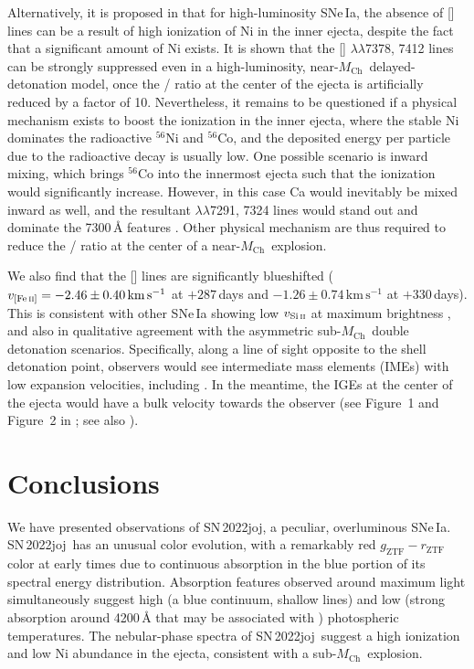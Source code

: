 \documentclass[twocolumn]{aastex631}
\newcommand{\sn}{SN\,2022joj}
\newcommand{\Mch}{$M_\mathrm{Ch}$}
\newcommand{\adam}[1]{\textcolor{orange}{[AAM: #1]}}
\newcommand{\chang}[1]{\textcolor{blue}{[Chang: #1]}}
\begin{document}
\begin{CJK*}{UTF8}{gbsn}
Alternatively, it is proposed in \citet{Blondin_2022} that for high-luminosity SNe\,Ia, the absence of [] lines can be a result of high ionization of Ni in the inner ejecta, despite the fact that a significant amount of Ni exists. It is shown that the [] $\lambda\lambda$7378, 7412 lines can be strongly suppressed even in a high-luminosity, near-\Mch\ delayed-detonation model, once the / ratio at the center of the ejecta is artificially reduced by a factor of 10. Nevertheless, it remains to be questioned if a physical mechanism exists to boost the ionization in the inner ejecta, where the stable Ni dominates the radioactive $^{56}$Ni and $^{56}$Co, and the deposited energy per particle due to the radioactive decay is usually low. One possible scenario is inward mixing, which brings $^{56}$Co into the innermost ejecta such that the ionization would significantly increase. However, in this case Ca would inevitably be mixed inward as well, and the resultant  $\lambda\lambda$7291, 7324 lines would stand out and dominate the 7300\,\r{A} features \citep{Blondin_2022}. Other physical mechanism are thus required to reduce the / ratio at the center of a near-\Mch\ explosion.

We also find that the [] lines are significantly blueshifted ($v_\mathrm{[Fe\,\textsc{ii}]}=-2.46\pm0.40\mathrm{\,km\,s^{-1}}$ at $+287$\,days and $-1.26\pm0.74\mathrm{\,km\,s^{-1}}$ at $+330$\,days). This is consistent with other SNe\,Ia showing low $v_\mathrm{Si\,\textsc{ii}}$ at maximum brightness \citep{Maeda_2010,Maguire_2018,Li_2021}, and also in qualitative agreement with the asymmetric sub-\Mch\ double detonation scenarios. Specifically, along a line of sight opposite to the shell detonation point, observers would see intermediate mass elements (IMEs) with low expansion velocities, including . In the meantime, the IGEs at the center of the ejecta would have a bulk velocity towards the observer (see Figure~1 and Figure~2 in \citealp{Bulla_2016}; see also \citealp{Fink_DD_2010}). %

\section{Conclusions} \label{sec:conclusion}
We have presented observations of \sn, a peculiar, overluminous SNe\,Ia. \sn\ has an unusual color evolution, with a remarkably red $g_\mathrm{ZTF}-r_\mathrm{ZTF}$ color at early times due to continuous absorption in the blue portion of its spectral energy distribution. Absorption features observed around maximum light simultaneously suggest high (a blue continuum, shallow  lines) and low (strong absorption around 4200\,\r{A} that may be associated with ) photospheric temperatures. The nebular-phase spectra of \sn\ suggest a high ionization and low Ni abundance in the ejecta, consistent with a sub-\Mch\ explosion.


\end{CJK*}
\end{document}
